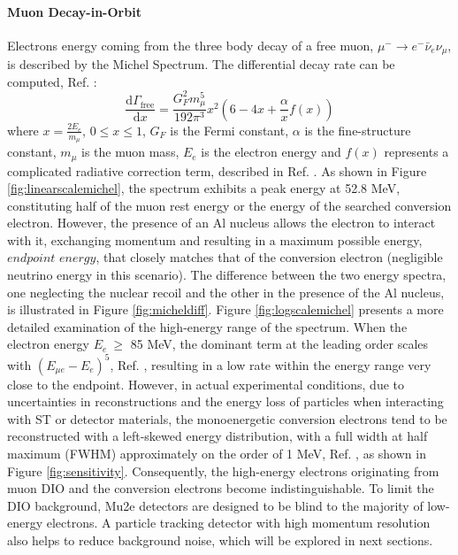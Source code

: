 \paragraph{Muon Decay-in-Orbit}
Electrons energy coming from the three body decay of a free muon, $\mu^- \rightarrow e^- \bar{\nu}_e \nu_\mu$, is described by the Michel Spectrum. The differential decay rate can be computed, Ref. \cite{michel}:
\begin{equation}
    \frac{\text{d}\Gamma_{\text{free}}}{\text{d}x}= \frac{G^2_F m^5_\mu}{192 \pi^3}x^2(6-4x+\frac{\alpha}{x}f(x)) 
\end{equation}
where $x=\frac{2 E_e}{m_\mu}$, $0\leq x\leq 1$, $G_F$ is the Fermi constant, $\alpha$ is the fine-structure constant, $m_\mu$ is the muon mass, $E_e$ is the electron energy and $f (x)$ represents a complicated radiative correction term, described in Ref. \cite{PhysRev.113.1652}. 
As shown in Figure \ref{fig:linearscalemichel}, the spectrum exhibits a peak energy at 52.8 MeV, constituting half of the muon rest energy  or the energy of the searched conversion electron. However, the presence of an Al nucleus allows the electron to interact with it, exchanging momentum and resulting in a maximum possible energy, $endpoint$ $energy$, that closely matches that of the conversion electron (negligible neutrino energy in this scenario). The difference between the two energy spectra, one neglecting the nuclear recoil and the 
other in the presence of the Al nucleus, is illustrated in Figure \ref{fig:micheldiff}. Figure \ref{fig:logscalemichel} presents a more detailed examination of the high-energy range of the spectrum. When the electron energy $E_e \ \geq$ 85 MeV, the dominant term at the leading order scales with $(E_{\mu e} - E_e)^5$, Ref. \cite{PhysRevD.84.013006}, resulting in a low rate within the energy range very close to the endpoint. However, in actual experimental conditions, due to uncertainties in reconstructions and the energy loss of particles when interacting with ST or detector materials, the monoenergetic conversion electrons tend to be reconstructed with a left-skewed energy distribution, with a full width at half maximum (FWHM) approximately on the order of 1 MeV, Ref. \cite{gaponenko}, as shown in Figure \ref{fig:sensitivity}. Consequently, the high-energy electrons originating from muon DIO and the conversion electrons become indistinguishable. To limit the DIO background, Mu2e detectors are designed to be blind to the majority of low-energy electrons. A particle tracking detector with high momentum resolution also helps to reduce background noise, which will be explored in next sections.
